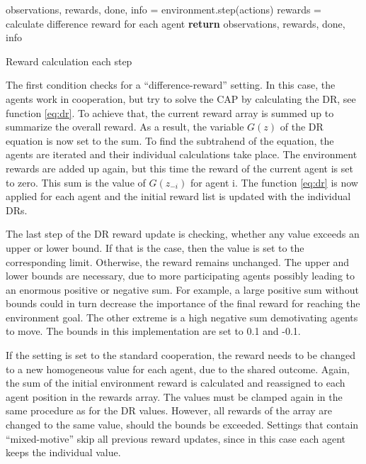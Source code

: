 \begin{algorithm}[H]
    \DontPrintSemicolon
    observations, rewards, done, info = environment.step(actions)\;
    \;
     {
        rewards = calculate difference reward for each agent
    }
    \;
    \;
    \;
    \textbf{return} observations, rewards, done, info\;
    \caption{Reward calculation each step}\label{algo:step_reward}
\end{algorithm}


The first condition checks for a ``difference-reward'' setting. In this case, the agents work in cooperation, but try to solve the CAP by calculating the DR, see function \eqref{eq:dr}. To achieve that, the current reward array is summed up to summarize the overall reward. As a result, the variable $G(z)$ of the DR equation is now set to the sum. To find the subtrahend of the equation, the agents are iterated and their individual calculations take place. The environment rewards are added up again, but this time the reward of the current agent is set to zero. This sum is the value of $G(z_{-i})$ for agent i. The function \eqref{eq:dr} is now applied for each agent and the initial reward list is updated with the individual DRs. 

The last step of the DR reward update is checking, whether any value exceeds an upper or lower bound. If that is the case, then the value is set to the corresponding limit. Otherwise, the reward remains unchanged. The upper and lower bounds are necessary, due to more participating agents possibly leading to an enormous positive or negative sum. For example, a large positive sum without bounds could in turn decrease the importance of the final reward for reaching the environment goal. The other extreme is a high negative sum demotivating agents to move. The bounds in this implementation are set to 0.1 and -0.1.

If the setting is set to the standard cooperation, the reward needs to be changed to a new homogeneous value for each agent, due to the shared outcome. Again, the sum of the initial environment reward is calculated and reassigned to each agent position in the rewards array. The values must be clamped again in the same procedure as for the DR values. However, all rewards of the array are changed to the same value, should the bounds be exceeded. Settings that contain ``mixed-motive'' skip all previous reward updates, since in this case each agent keeps the individual value.

